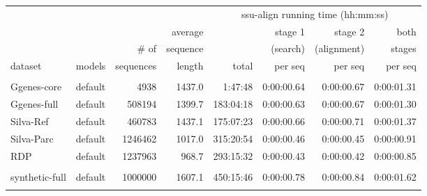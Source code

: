 \begin{table}[hb]
\begin{center}
  \scriptsize
  \begin{tabular}{llrr|rrrr} 
                &          &         &        &  \multicolumn{4}{c}{ssu-align running time (hh:mm:ss)} \\ \cline{5-8}
                &          &         &average &           & stage 1      & stage 2      & both   \\ 
                &          &\# of    &sequence&           & (search)     & (alignment)  & stages \\ 
dataset         & models   &sequences& length & total     & per seq      & per seq      & per seq     \\ \hline
& & & & & & & \\
Ggenes-core     & default  &    4938 & 1437.0 &   1:47:48 &   0:00:00.64 &   0:00:00.67 &   0:00:01.31 \\
Ggenes-full     & default  &  508194 & 1399.7 & 183:04:18 &   0:00:00.63 &   0:00:00.67 &   0:00:01.30 \\
Silva-Ref       & default  &  460783 & 1437.1 & 175:07:23 &   0:00:00.66 &   0:00:00.71 &   0:00:01.37 \\
Silva-Parc      & default  & 1246462 & 1017.0 & 315:20:54 &   0:00:00.46 &   0:00:00.45 &   0:00:00.91 \\
RDP             & default  & 1237963 &  968.7 & 293:15:32 &   0:00:00.43 &   0:00:00.42 &   0:00:00.85 \\
& & & & & & & \\
synthetic-full  & default  & 1000000 & 1607.1 & 450:15:46 &   0:00:00.78 &   0:00:00.84 &   0:00:01.62 \\
& & & & & & & \\

\end{tabular}
\end{center}
\end{table}

